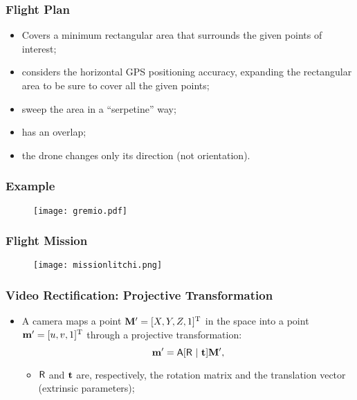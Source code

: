 \documentclass{beamer}
\begin{document}
		\begin{frame}\frametitle{Flight Plan}
			\begin{itemize}
				\item Covers a minimum rectangular area that surrounds the given points of interest;
				\item considers the horizontal GPS positioning accuracy, expanding the rectangular area to be sure to cover all the given points;
				\item sweep the area in a ``serpetine'' way;
				\item has an overlap;
				\item the drone changes only its direction (not orientation).
			\end{itemize}
		\end{frame}


		\begin{frame}
			\frametitle{Example}
			\begin{figure}
				\centering
				\texttt{[image: gremio.pdf]}
			\end{figure}
		\end{frame}




		\begin{frame}
			\frametitle{Flight Mission}
			\begin{figure}
				\centering
				\texttt{[image: missionlitchi.png]}
			\end{figure}
		\end{frame}


		\begin{frame}\frametitle{Video Rectification: Projective Transformation}
			\begin{itemize}
			 \item  A camera maps a point $\mathbf{M}' = [X,Y,Z,1]^{\mathrm{T}}$ in the space into a point $\mathbf{m}' = [u,v,1]^{\mathrm{T}}$ through a projective transformation:
			 \begin{equation*}
			\label{eq:projection}
			\mathbf{m}' = \mathsf{A}[\mathsf{R}~|~\mathbf{t}]\mathbf{M}',
			\end{equation*}
			\begin{itemize}
			 \item $\mathsf{R}$ and $\mathbf{t}$ are, respectively, the rotation matrix and the translation vector (extrinsic parameters);%
			\end{itemize}
			\end{itemize}
		\end{frame}
\end{document}
